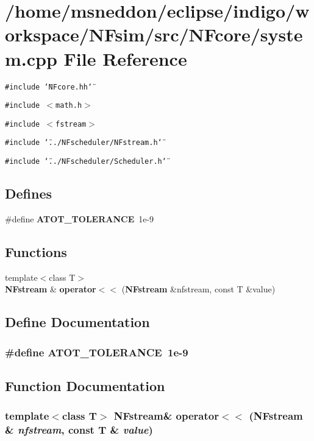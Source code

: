 \section{/home/msneddon/eclipse/indigo/workspace/NFsim/src/NFcore/system.cpp File Reference}
\label{system_8cpp}


{\tt \#include \char`\"{}NFcore.hh\char`\"{}}\par
{\tt \#include $<$math.h$>$}\par
{\tt \#include $<$fstream$>$}\par
{\tt \#include \char`\"{}../NFscheduler/NFstream.h\char`\"{}}\par
{\tt \#include \char`\"{}../NFscheduler/Scheduler.h\char`\"{}}\par
\subsection*{Defines}
\begin{CompactItemize}
\item 
\#define {\bf ATOT\_\-TOLERANCE}~1e-9
\end{CompactItemize}
\subsection*{Functions}
\begin{CompactItemize}
\item 
{\footnotesize template$<$class T$>$ }\\{\bf NFstream} \& {\bf operator$<$$<$} ({\bf NFstream} \&nfstream, const T \&value)
\end{CompactItemize}


\subsection{Define Documentation}
\subsubsection{\setlength{\rightskip}{0pt plus 5cm}\#define ATOT\_\-TOLERANCE~1e-9}\label{system_8cpp_11dcdd044d0b4c0c37b1b39b9907d6c0}




\subsection{Function Documentation}
\subsubsection{\setlength{\rightskip}{0pt plus 5cm}template$<$class T$>$ {\bf NFstream}\& operator$<$$<$ ({\bf NFstream} \& {\em nfstream}, const T \& {\em value})\hspace{0.3cm}{\tt  [inline]}}\label{system_8cpp_ef588953052314e1b69285568a59947f}



